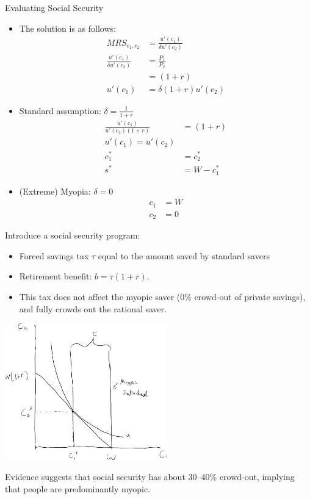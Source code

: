 \documentclass[8pt]{extarticle}
\begin{document}
\begin{problem}{Evaluating Social Security}
\begin{center}
    \end{center}
    \begin{itemize}
      \item The solution is as follows:
        \begin{align*}
          MRS_{c_1,c_2} &= \frac{u'(c_1)}{\delta u'(c_2)}\\
                       \frac{u'(c_1)}{\delta u'(c_2)} &= \frac{P_1}{P_2}\\
                                                      &= (1+r)\\
                       u'(c_1) &= \delta (1+r) u'(c_2)
        \end{align*}
      \item Standard assumption: $\delta = \frac{1}{1+r}$
        \begin{align*}
          \frac{u'(c_1)}{u'(c_2)(1+r)} &= (1+r)\\
          u'(c_1) = u'(c_2)\\
          c_1^* &= c_2^*\\
          s^* &= W - c_1^*
        \end{align*}
      \item (Extreme) Myopia: $\delta = 0$
        \begin{align*}
          c_1 &= W\\
          c_2 &= 0
        \end{align*}
    \end{itemize}
    Introduce a social security program:
    \begin{itemize}
      \item Forced savings tax $\tau$ equal to the amount saved by standard savers
      \item Retirement benefit: $b = \tau(1+r)$.
      \item This tax does not affect the myopic saver (0\% crowd-out of private savings), and fully crowds out the rational saver.
    \end{itemize}
    \begin{center}
      \includegraphics[width=7cm]{images/retirement_myopia.png}
    \end{center}
    Evidence suggests that social security has about 30--40\% crowd-out, implying that people are predominantly myopic.\newline


\end{problem}
\end{document}
